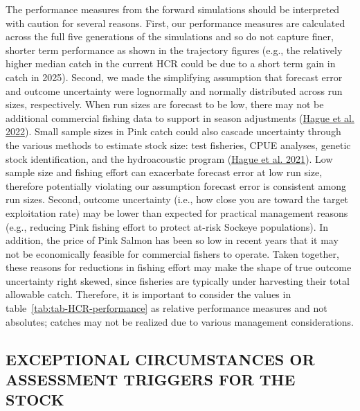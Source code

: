 \documentclass[11pt]{book}
\begin{document}
The performance measures from the forward simulations should be interpreted with caution for several reasons. First, our performance measures are calculated across the full five generations of the simulations and so do not capture finer, shorter term performance as shown in the trajectory figures (e.g., the relatively higher median catch in the current HCR could be due to a short term gain in catch in 2025). Second, we made the simplifying assumption that forecast error and outcome uncertainty were lognormally and normally distributed across run sizes, respectively. When run sizes are forecast to be low, there may not be additional commercial fishing data to support in season adjustments (\protect\hyperlink{ref-hagueImprovementsFraserRiver2022}{Hague et al. 2022}). Small sample sizes in Pink catch could also cascade uncertainty through the various methods to estimate stock size: test fisheries, CPUE analyses, genetic stock identification, and the hydroacoustic program (\protect\hyperlink{ref-hagueMovingTargetsAssessing2021}{Hague et al. 2021}). Low sample size and fishing effort can exacerbate forecast error at low run size, therefore potentially violating our assumption forecast error is consistent among run sizes. Second, outcome uncertainty (i.e., how close you are toward the target exploitation rate) may be lower than expected for practical management reasons (e.g., reducing Pink fishing effort to protect at-risk Sockeye populations). In addition, the price of Pink Salmon has been so low in recent years that it may not be economically feasible for commercial fishers to operate. Taken together, these reasons for reductions in fishing effort may make the shape of true outcome uncertainty right skewed, since fisheries are typically under harvesting their total allowable catch. Therefore, it is important to consider the values in table~\ref{tab:tab-HCR-performance} as relative performance measures and not absolutes; catches may not be realized due to various management considerations.

\hypertarget{exceptional-circumstances-or-assessment-triggers-for-the-stock}{%
\subsection{EXCEPTIONAL CIRCUMSTANCES OR ASSESSMENT TRIGGERS FOR THE STOCK}\label{exceptional-circumstances-or-assessment-triggers-for-the-stock}}
\end{document}

